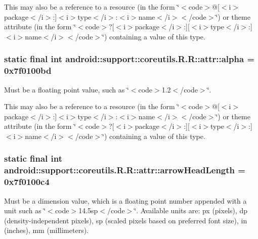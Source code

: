 This may also be a reference to a resource (in the form \char`\"{}$<$code$>$@\mbox{[}$<$i$>$package$<$/i$>$:\mbox{]}$<$i$>$type$<$/i$>$:$<$i$>$name$<$/i$>$$<$/code$>$\char`\"{}) or theme attribute (in the form \char`\"{}$<$code$>$?\mbox{[}$<$i$>$package$<$/i$>$:\mbox{]}\mbox{[}$<$i$>$type$<$/i$>$:\mbox{]}$<$i$>$name$<$/i$>$$<$/code$>$\char`\"{}) containing a value of this type. \hypertarget{classandroid_1_1support_1_1coreutils_1_1_r_1_1attr_416c183c9511e0c3df7cbe73a5bae290}{
\subsubsection[{alpha}]{\setlength{\rightskip}{0pt plus 5cm}static final int android::support::coreutils.R.R::attr::alpha = 0x7f0100bd}}
\label{classandroid_1_1support_1_1coreutils_1_1_r_1_1attr_416c183c9511e0c3df7cbe73a5bae290}


Must be a floating point value, such as \char`\"{}$<$code$>$1.2$<$/code$>$\char`\"{}. 

This may also be a reference to a resource (in the form \char`\"{}$<$code$>$@\mbox{[}$<$i$>$package$<$/i$>$:\mbox{]}$<$i$>$type$<$/i$>$:$<$i$>$name$<$/i$>$$<$/code$>$\char`\"{}) or theme attribute (in the form \char`\"{}$<$code$>$?\mbox{[}$<$i$>$package$<$/i$>$:\mbox{]}\mbox{[}$<$i$>$type$<$/i$>$:\mbox{]}$<$i$>$name$<$/i$>$$<$/code$>$\char`\"{}) containing a value of this type. \hypertarget{classandroid_1_1support_1_1coreutils_1_1_r_1_1attr_a2fbe5c7b0c2fd46642dcf995062e58d}{
\subsubsection[{arrowHeadLength}]{\setlength{\rightskip}{0pt plus 5cm}static final int android::support::coreutils.R.R::attr::arrowHeadLength = 0x7f0100c4}}
\label{classandroid_1_1support_1_1coreutils_1_1_r_1_1attr_a2fbe5c7b0c2fd46642dcf995062e58d}


Must be a dimension value, which is a floating point number appended with a unit such as \char`\"{}$<$code$>$14.5sp$<$/code$>$\char`\"{}. Available units are: px (pixels), dp (density-independent pixels), sp (scaled pixels based on preferred font size), in (inches), mm (millimeters). 

